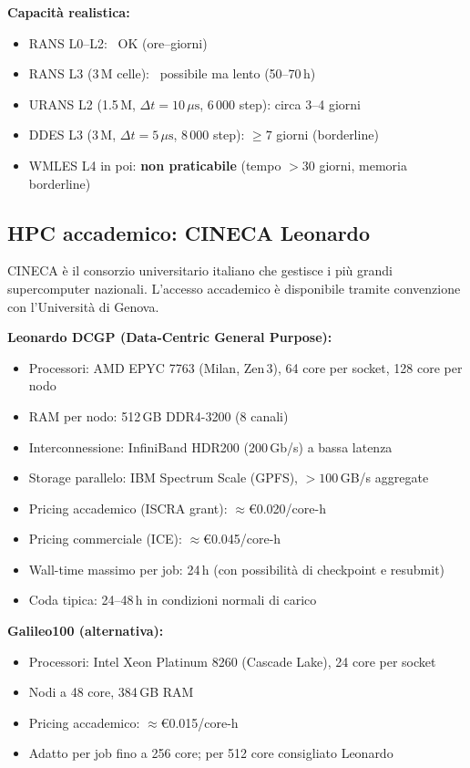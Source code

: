 \documentclass[11pt,a4paper]{article}
\newcommand{\mus}{\,\mu\mathrm{s}}
\begin{document}
\textbf{Capacità realistica:}
\begin{itemize}
  \item RANS L0--L2: \checkmark\ OK (ore--giorni)
  \item RANS L3 (3\,M celle): \checkmark\ possibile ma lento (50--70\,h)
  \item URANS L2 (1.5\,M, $\Delta t=10\mus$, 6\,000 step): circa 3--4 giorni
  \item DDES L3 (3\,M, $\Delta t=5\mus$, 8\,000 step): $\geq 7$ giorni (borderline)
  \item WMLES L4 in poi: \textbf{non praticabile} (tempo $>30$ giorni, memoria borderline)
\end{itemize}

\subsection{HPC accademico: CINECA Leonardo}

CINECA è il consorzio universitario italiano che gestisce i più grandi supercomputer nazionali. L'accesso accademico è disponibile tramite convenzione con l'Università di Genova.

\textbf{Leonardo DCGP (Data-Centric General Purpose):}
\begin{itemize}
  \item Processori: AMD EPYC 7763 (Milan, Zen\,3), 64 core per socket, 128 core per nodo
  \item RAM per nodo: 512\,GB DDR4-3200 (8 canali)
  \item Interconnessione: InfiniBand HDR200 (200\,Gb/s) a bassa latenza
  \item Storage parallelo: IBM Spectrum Scale (GPFS), $>100$\,GB/s aggregate
  \item Pricing accademico (ISCRA grant): $\approx$€0.020/core-h
  \item Pricing commerciale (ICE): $\approx$€0.045/core-h
  \item Wall-time massimo per job: 24\,h (con possibilità di checkpoint e resubmit)
  \item Coda tipica: 24--48\,h in condizioni normali di carico
\end{itemize}

\textbf{Galileo100 (alternativa):}
\begin{itemize}
  \item Processori: Intel Xeon Platinum 8260 (Cascade Lake), 24 core per socket
  \item Nodi a 48 core, 384\,GB RAM
  \item Pricing accademico: $\approx$€0.015/core-h
  \item Adatto per job fino a 256 core; per 512 core consigliato Leonardo
\end{itemize}
\end{document}

